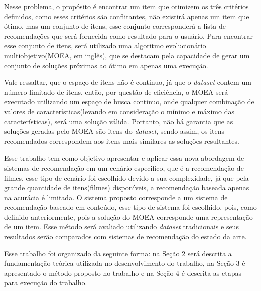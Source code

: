 Nesse problema, o propósito é encontrar um item que otimizem os três critérios definidos, como esses critérios são conflitantes, não existirá apenas um item que ótimo, mas um conjunto de itens, esse conjunto corresponderá a lista de recomendações que será fornecida como resultado para o usuário. Para encontrar esse conjunto de itens, será utilizado uma algoritmo evolucionário multiobjetivo(MOEA, em inglês), que se destacam pela capacidade de gerar um conjunto de soluções próximas ao ótimo  em apenas uma execução.

Vale ressaltar, que o espaço de itens não é continuo, já que o \textit{dataset} contem um número limitado de itens, então, por questão de eficiência, o MOEA será executado utilizando um espaço de busca continuo, onde qualquer combinação de valores de características(levando em consideração o mínimo e máximo das características), será uma solução válida. Portanto, não  há garantia que as soluções geradas pelo MOEA são itens do \textit{dataset}, sendo assim, os itens recomendados correspondem aos itens mais similares as soluções resultantes.

Esse trabalho tem como objetivo apresentar e aplicar essa  nova abordagem de sistemas de recomendação em um cenário especifico, que é a recomendação de filmes, esse tipo de cenário foi escolhido devido a sua complexidade, já que pela grande quantidade de itens(filmes) disponíveis, a recomendação baseada apenas na acurácia é limitada. O sistema proposto corresponde a um sistema de recomendação baseado em conteúdo, esse tipo de sistema foi escolhido, pois, como definido anteriormente, pois a solução do MOEA corresponde uma representação de um item. Esse método será avaliado utilizando \textit{dataset} tradicionais e seus resultados serão comparados com sistemas de recomendação do estado da arte.

Esse trabalho foi organizado da seguinte forma: na Seção 2 será descrita a fundamentação teórica utilizada no desenvolvimento do trabalho, na Seção 3 é apresentado o método proposto no trabalho e na Seção 4 é descrita as etapas para execução do trabalho.

